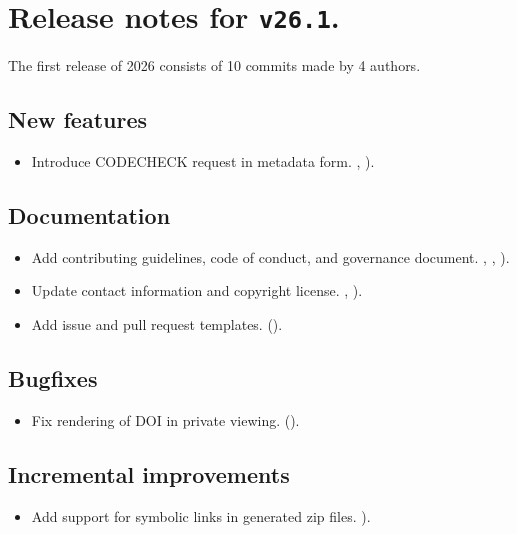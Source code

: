 \section*{Release notes for \texttt{v26.1}.}

  The first release of 2026 consists of 10 commits made by 4 authors.

\subsection*{New features}
\begin{itemize}
\item{Introduce CODECHECK request in metadata form.
    ,
    ).}
\end{itemize}

\subsection*{Documentation}
\begin{itemize}
\item{Add contributing guidelines, code of conduct, and governance document.
    ,
    ,
    ).}
\item{Update contact information and copyright license.
    ,
    ).}
\item{Add issue and pull request templates.
    ().}
\end{itemize}

\subsection*{Bugfixes}
\begin{itemize}
\item{Fix rendering of DOI in private viewing.
    ().}
\end{itemize}

\subsection*{Incremental improvements}
\begin{itemize}
\item{Add support for symbolic links in generated zip files.
    ).}
\end{itemize}

